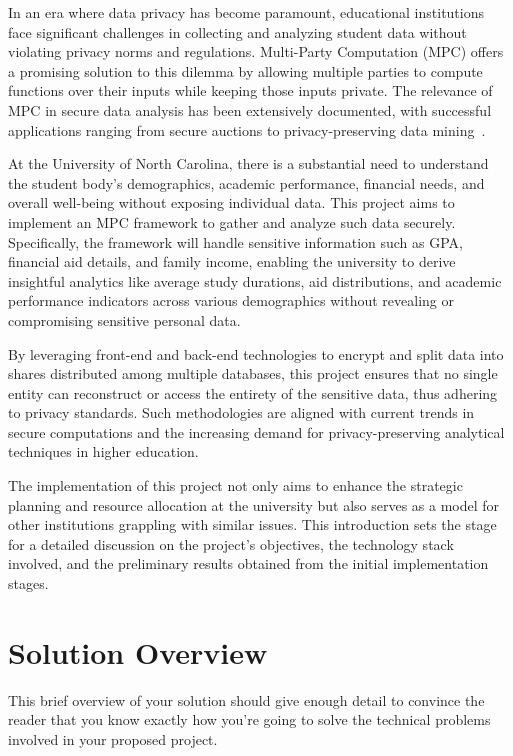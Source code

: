 \documentclass[conference]{IEEEtran}
\begin{document}
In an era where data privacy has become paramount, educational institutions face significant challenges in collecting and analyzing student data without violating privacy norms and regulations. Multi-Party Computation (MPC) offers a promising solution to this dilemma by allowing multiple parties to compute functions over their inputs while keeping those inputs private. The relevance of MPC in secure data analysis has been extensively documented, with successful applications ranging from secure auctions to privacy-preserving data mining~\cite{MPC1}.

At the University of North Carolina, there is a substantial need to understand the student body's demographics, academic performance, financial needs, and overall well-being without exposing individual data. This project aims to implement an MPC framework to gather and analyze such data securely. Specifically, the framework will handle sensitive information such as GPA, financial aid details, and family income, enabling the university to derive insightful analytics like average study durations, aid distributions, and academic performance indicators across various demographics without revealing or compromising sensitive personal data.

By leveraging front-end and back-end technologies to encrypt and split data into shares distributed among multiple databases, this project ensures that no single entity can reconstruct or access the entirety of the sensitive data, thus adhering to privacy standards. Such methodologies are aligned with current trends in secure computations and the increasing demand for privacy-preserving analytical techniques in higher education.

The implementation of this project not only aims to enhance the strategic planning and resource allocation at the university but also serves as a model for other institutions grappling with similar issues. This introduction sets the stage for a detailed discussion on the project's objectives, the technology stack involved, and the preliminary results obtained from the initial implementation stages.

\section{Solution Overview}

This brief overview of your solution should give enough detail to convince the reader that you know exactly how you're going to solve the technical problems involved in your proposed project.
\end{document}
